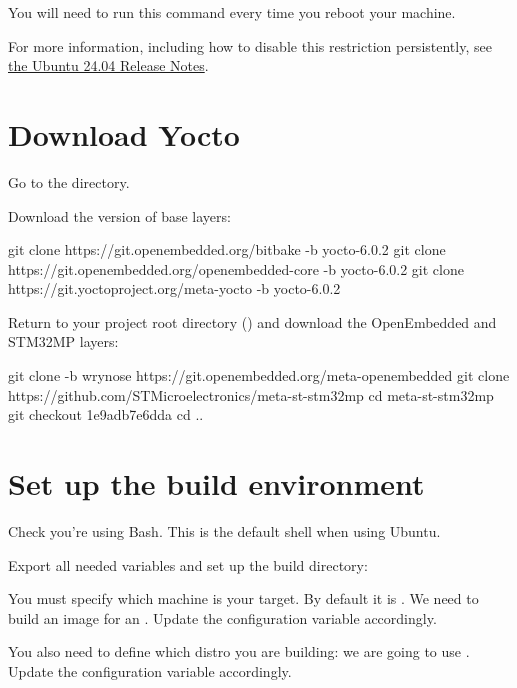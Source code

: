 You will need to run this command every time you reboot your machine.

For more information, including how to disable this restriction
persistently, see
\href{https://discourse.ubuntu.com/t/ubuntu-24-04-lts-noble-numbat-release-notes/39890#p-99950-unprivileged-user-namespace-restrictions}
     {the Ubuntu 24.04 Release Notes}.

\section{Download Yocto}

Go to the  directory.

Download the  version of base layers:
\begin{bashinput}
git clone https://git.openembedded.org/bitbake -b yocto-6.0.2
git clone https://git.openembedded.org/openembedded-core -b yocto-6.0.2
git clone https://git.yoctoproject.org/meta-yocto -b yocto-6.0.2
\end{bashinput}

Return to your project root directory ()
and download the OpenEmbedded and STM32MP layers:
\begin{bashinput}
git clone -b wrynose https://git.openembedded.org/meta-openembedded
git clone https://github.com/STMicroelectronics/meta-st-stm32mp
cd meta-st-stm32mp
git checkout 1e9adb7e6dda
cd ..
\end{bashinput}

\section{Set up the build environment}

Check you're using Bash. This is the default shell when using Ubuntu.

Export all needed variables and set up the build directory:

You must specify which machine is your target. By default it
is . We need to build an image for an .
Update the  configuration variable accordingly.

You also need to define which distro you are building: we are going to use
.
Update the  configuration variable accordingly.

